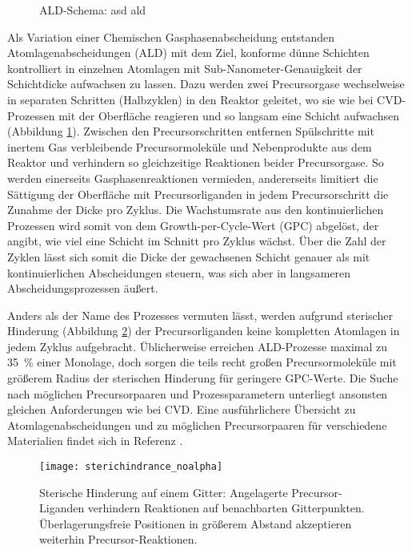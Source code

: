 \begin{figure}
  \centering
  \def\svgwidth{\textwidth}
  
  \caption[ALD-Schema]{ALD-Schema: asd ald}
  \label{fig:ald-schema}
\end{figure}

Als Variation einer Chemischen Gasphasenabscheidung entstanden Atomlagenabscheidungen (ALD) mit dem Ziel, konforme dünne Schichten kontrolliert in einzelnen Atomlagen mit Sub-Nanometer-Genauigkeit der Schichtdicke aufwachsen zu lassen.
Dazu werden zwei Precursorgase wechselweise in separaten Schritten (Halbzyklen) in den Reaktor geleitet, wo sie wie bei CVD-Prozessen mit der Oberfläche reagieren und so langsam eine Schicht aufwachsen (Abbildung \ref{fig:ald-schema}).
Zwischen den Precursorschritten entfernen Spülschritte mit inertem Gas verbleibende Precursormoleküle und Nebenprodukte aus dem Reaktor und verhindern so gleichzeitige Reaktionen beider Precursorgase.
So werden einerseits Gasphasenreaktionen vermieden, andererseits limitiert die Sättigung der Oberfläche mit Precursorliganden in jedem Precursorschritt die Zunahme der Dicke pro Zyklus.
Die Wachstumsrate aus den kontinuierlichen Prozessen wird somit von dem Growth-per-Cycle-Wert (GPC) abgelöst, der angibt, wie viel eine Schicht im Schnitt pro Zyklus wächst.
Über die Zahl der Zyklen lässt sich somit die Dicke der gewachsenen Schicht genauer als mit kontinuierlichen Abscheidungen steuern, was sich aber in langsameren Abscheidungsprozessen äußert.

Anders als der Name des Prozesses vermuten lässt, werden aufgrund sterischer Hinderung (Abbildung \ref{fig:sterichindrance}) der Precursorliganden keine kompletten Atomlagen in jedem Zyklus aufgebracht.
Üblicherweise erreichen ALD-Prozesse maximal zu \SI{35}{\percent} einer Monolage, doch sorgen die teils recht großen Precursormoleküle mit größerem Radius der sterischen Hinderung für geringere GPC-Werte.
Die Suche nach möglichen Precursorpaaren und Prozessparametern unterliegt ansonsten gleichen Anforderungen wie bei CVD.
Eine ausführlichere Übersicht zu Atomlagenabscheidungen und zu möglichen Precursorpaaren für verschiedene Materialien findet sich in Referenz \cite{puurunen_surface_2005}.

\begin{figure}
  \centering
  \texttt{[image: sterichindrance\_noalpha]}
  \caption[Sterische Hinderung]{Sterische Hinderung auf einem Gitter:
    Angelagerte Precursor-Liganden verhindern Reaktionen auf benachbarten Gitterpunkten.
    Überlagerungsfreie Positionen in größerem Abstand akzeptieren weiterhin Precursor-Reaktionen.
  }
  \label{fig:sterichindrance}
\end{figure}

